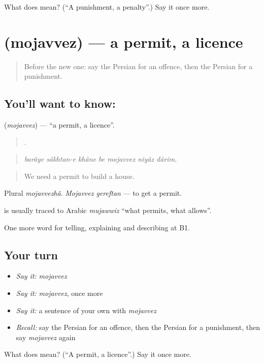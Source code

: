 \begin{tcolorbox}[breakable,colback=teal!4,colframe=teal!35!black,title={Before you move on}]
What does  mean? (\textquotedblleft{}A punishment, a penalty\textquotedblright{}.) Say it once more.
\end{tcolorbox}
\section[\texorpdfstring{\fa{مجوز} (mojavvez)}{مجوز (mojavvez)}]{ (mojavvez) — a permit, a licence}

\label{lesson:FA-C405-mojavvez}



\begin{quote}
Before the new one: say the Persian for an offence, then the Persian for a punishment.
\end{quote}

\subsection*{You'll want to know: }
\textbf{} (\emph{mojavvez}) — \textquotedblleft{}a permit, a licence\textquotedblright{}.

\begin{quote}
      .
\end{quote}

\begin{quote}
\emph{barâye sâkhtan-e khâne be mojavvez niyâz dârim.}
\end{quote}

\begin{quote}
We need a permit to build a house.
\end{quote}

Plural \emph{mojavvezhâ}. \emph{Mojavvez gereftan} — to get a permit.

\begin{cousinweb}
\textbf{} is usually traced to Arabic \emph{mujawwiz} \textquotedblleft{}what permits, what allows\textquotedblright{}.
\end{cousinweb}

\begin{grammarlens}[title={What you've built}]
One more word for telling, explaining and describing at B1.
\end{grammarlens}

\subsection*{Your turn}
\begin{itemize}
\raggedright
  \item \emph{Say it:} \emph{mojavvez}
  \item \emph{Say it:} \emph{mojavvez}, once more
  \item \emph{Say it:} a sentence of your own with \emph{mojavvez}
  \item \emph{Recall:} say the Persian for an offence, then the Persian for a punishment, then say \emph{mojavvez} again
\end{itemize}

\begin{tcolorbox}[breakable,colback=teal!4,colframe=teal!35!black,title={Before you move on}]
What does  mean? (\textquotedblleft{}A permit, a licence\textquotedblright{}.) Say it once more.
\end{tcolorbox}
